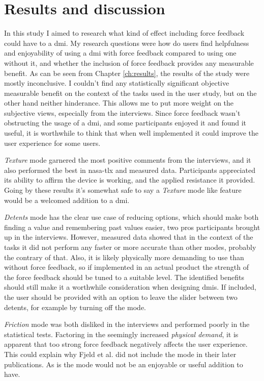 \section{Results and discussion}

In this study I aimed to research what kind of effect including force feedback could have to a \gls{dmi}. My research questions were how do users find helpfulness and enjoyability of using a \gls{dmi} with force feedback compared to using one without it, and whether the inclusion of force feedback provides any measurable benefit. As can be seen from Chapter \ref{ch:results}, the results of the study were mostly inconclusive. I couldn't find any statistically significant objective measurable benefit on the context of the tasks used in the user study, but on the other hand neither hinderance. This allows me to put more weight on the subjective views, especially from the interviews. Since force feedback wasn't obstructing the usage of a \gls{dmi}, and some participants enjoyed it and found it useful, it is worthwhile to think that when well implemented it could improve the user experience for some users.

\textit{Texture} mode garnered the most positive comments from the interviews, and it also performed the best in \gls{nasa-tlx} and measured data. Participants appreciated its ability to affirm the device is working, and the applied resistance it provided. Going by these results it's somewhat safe to say a \textit{Texture} mode like feature would be a welcomed addition to a \gls{dmi}.

\textit{Detents} mode has the clear use case of reducing options, which should make both finding a value and remembering past values easier, two pros participants brought up in the interviews. However, measured data showed that in the context of the tasks it did not perform any faster or more accurate than other modes, probably the contrary of that. Also, it is likely physically more demanding to use than without force feedback, so if implemented in an actual product the strength of the force feedback should be tuned to a suitable level. The identified benefits should still make it a worthwhile consideration when designing \glspl{dmi}. If included, the user should be provided with an option to leave the slider between two detents, for example by turning off the mode.

\textit{Friction} mode was both disliked in the interviews and performed poorly in the statistical tests. Factoring in the seemingly increased \textit{physical demand}, it is apparent that too strong force feedback negatively affects the user experience. This could explain why Fjeld et al. did not include the mode in their later publications. As is the mode would not be an enjoyable or useful addition to have.


